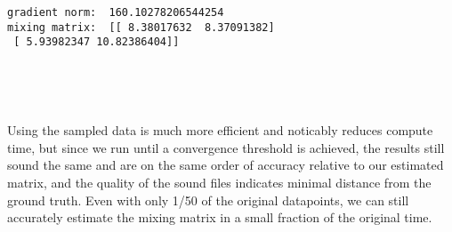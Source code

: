 \documentclass[11pt]{article}
\begin{document}
    \begin{Verbatim}[commandchars=\\\{\}]
gradient norm:  160.10278206544254
mixing matrix:  [[ 8.38017632  8.37091382]
 [ 5.93982347 10.82386404]]

    \end{Verbatim}

    \begin{center}
    \end{center}
    { \hspace*{\fill} \\}
    
    \begin{center}
    \end{center}
    { \hspace*{\fill} \\}
    
    Using the sampled data is much more efficient and noticably reduces
compute time, but since we run until a convergence threshold is
achieved, the results still sound the same and are on the same order of
accuracy relative to our estimated matrix, and the quality of the sound
files indicates minimal distance from the ground truth. Even with only
1/50 of the original datapoints, we can still accurately estimate the
mixing matrix in a small fraction of the original time.


    
    
    
    
\end{document}
